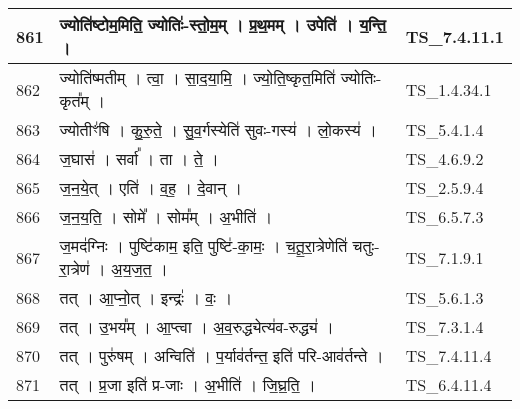 \documentclass[17pt]{extarticle}
\begin{document}
\begin{longtable}{||p{0.4in}||p{4.9in}||p{0.9in}||}
    \hline
        
    861 & ज्योति॑ष्टोम॒मिति॒ ज्योतिः॑{-}स्तो॒म॒म्   ।   प्र॒थ॒मम्   ।   उपेति॑   ।   य॒न्ति॒   ।    & TS\_7.4.11.1       \\
    
    \hline
        
    862 & ज्योति॑ष्मतीम्   ।   त्वा॒   ।   सा॒द॒या॒मि॒   ।   ज्यो॒ति॒ष्कृत॒मिति॑ ज्योतिः{-}कृत᳚म्   ।    & TS\_1.4.34.1       \\
    
    \hline
        
    863 & ज्योतीꣳ॑षि   ।   कु॒रु॒ते॒   ।   सु॒व॒र्गस्येति॑ सुवः{-}गस्य॑   ।   लो॒कस्य॑   ।    & TS\_5.4.1.4       \\
    
    \hline
        
    864 & ज॒घास॑   ।   सर्वा᳚   ।   ता   ।   ते॒   ।    & TS\_4.6.9.2       \\
    
    \hline
        
    865 & ज॒न॒ये॒त्   ।   एति॑   ।   व॒ह॒   ।   दे॒वान्   ।    & TS\_2.5.9.4       \\
    
    \hline
        
    866 & ज॒न॒य॒ति॒   ।   सोमे᳚   ।   सोम᳚म्   ।   अ॒भीति॑   ।    & TS\_6.5.7.3       \\
    
    \hline
        
    867 & ज॒मद॑ग्निः   ।   पुष्टि॑काम॒ इति॒ पुष्टि॑{-}का॒मः॒   ।   च॒तू॒रा॒त्रेणेति॑ चतुः{-}रा॒त्रेण॑   ।   अ॒य॒ज॒त॒   ।    & TS\_7.1.9.1       \\
    
    \hline
        
    868 & तत्   ।   आ॒प्नो॒त्   ।   इन्द्रः॑   ।   वः॒   ।    & TS\_5.6.1.3       \\
    
    \hline
        
    869 & तत्   ।   उ॒भय᳚म्   ।   आ॒प्त्वा   ।   अ॒व॒रुद्ध्येत्य॑व{-}रुद्ध्य॑   ।    & TS\_7.3.1.4       \\
    
    \hline
        
    870 & तत्   ।   पुरु॑षम्   ।   अन्विति॑   ।   प॒र्याव॑र्तन्त॒ इति॑ परि{-}आव॑र्तन्ते   ।    & TS\_7.4.11.4       \\
    
    \hline
        
    871 & तत्   ।   प्र॒जा इति॑ प्र{-}जाः   ।   अ॒भीति॑   ।   जि॒घ्र॒ति॒   ।    & TS\_6.4.11.4       \\
    

\end{longtable}
\end{document}
